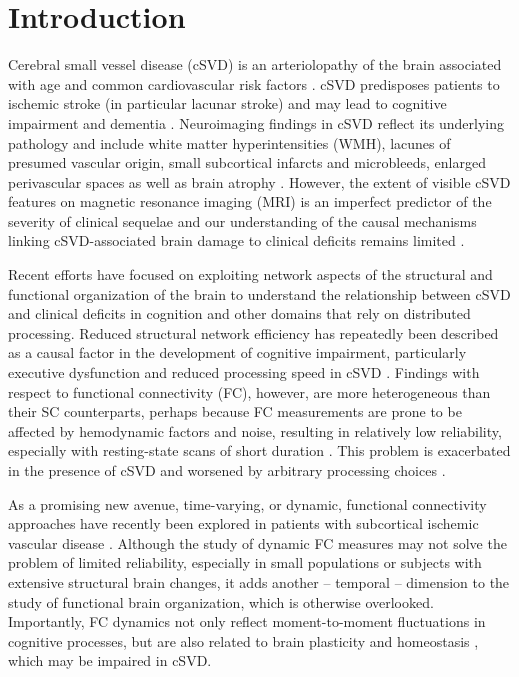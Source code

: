 \section{Introduction} \label{intro}
Cerebral small vessel disease (cSVD) is an arteriolopathy of the brain associated with age and common cardiovascular risk factors \citep{Wardlaw2013-yd}.
cSVD predisposes patients to ischemic stroke (in particular lacunar stroke) and may lead to cognitive impairment and dementia \citep{Cannistraro2019-ly}.
Neuroimaging findings in cSVD reflect its underlying pathology \citep{Wardlaw2015-ri} and include white matter hyperintensities (WMH), lacunes of presumed vascular origin, small subcortical infarcts and microbleeds, enlarged perivascular spaces as well as brain atrophy \citep{Wardlaw2013-sc}.
However, the extent of visible cSVD features on magnetic resonance imaging (MRI) is an imperfect predictor of the severity of clinical sequelae \citep{Das2019-pc} and our understanding of the causal mechanisms linking cSVD-associated brain damage to clinical deficits remains limited \citep{Bos2018-qj}.

Recent efforts have focused on exploiting network aspects of the structural \citep{Tuladhar2016-ae,Tuladhar2020-fp,Lawrence2018-ti} and functional \citep{Dey2016-qg,Schulz2021-ho} organization of the brain to understand the relationship between cSVD and clinical deficits in cognition and other domains that rely on distributed processing.
Reduced structural network efficiency has repeatedly been described as a causal factor in the development of cognitive impairment, particularly executive dysfunction and reduced processing speed in cSVD \citep{Lawrence2014-xp,Shen2020-yv,Reijmer2016-wm,Prins2005-ej}.
Findings with respect to functional connectivity (FC), however, are more heterogeneous than their SC counterparts, perhaps because FC measurements are prone to be affected by hemodynamic factors and noise, resulting in relatively low reliability, especially with resting-state scans of short duration \citep{laumann2015functional}. 
This problem is exacerbated in the presence of cSVD and worsened by arbitrary processing choices \citep{Lawrence2018-sv,Gesierich2020-db}.

As a promising new avenue, time-varying, or dynamic, functional connectivity approaches have recently been explored in patients with subcortical ischemic vascular disease \citep{Yin2022-cv,Xu2021-ib}. 
Although the study of dynamic FC measures may not solve the problem of limited reliability, especially in small populations or subjects with extensive structural brain changes, it adds another -- temporal -- dimension to the study of functional brain organization, which is otherwise overlooked.
Importantly, FC dynamics not only reflect moment-to-moment fluctuations in cognitive processes, but are also related to brain plasticity and homeostasis , which may be impaired in cSVD.

